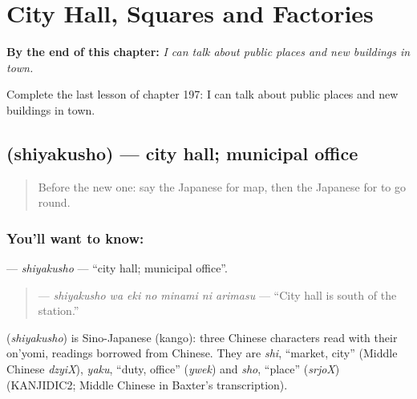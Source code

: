 
\chapter{City Hall, Squares and Factories}
\label{ch:ja-city-hall-squares-and-factories}

\begin{chapteropening}
\textbf{By the end of this chapter:} \emph{I can talk about public places and new buildings in town.}

Complete the last lesson of chapter 197: I can talk about public places and new buildings in town.
\end{chapteropening}

\section[\texorpdfstring{\ja{しやくしょ} (shiyakusho)}{しやくしょ (shiyakusho)}]{ (shiyakusho) — city hall; municipal office}

\label{lesson:JA-C197-shiyakusho}



\begin{quote}
Before the new one: say the Japanese for map, then the Japanese for to go round.
\end{quote}

\subsection*{You'll want to know: }
\textbf{} — \emph{shiyakusho} — \textquotedblleft{}city hall; municipal office\textquotedblright{}.

\begin{quote}
\textbf{   } — \emph{shiyakusho wa eki no minami ni arimasu} — \textquotedblleft{}City hall is south of the station.\textquotedblright{}
\end{quote}

\begin{cousinweb}
\textbf{} (\emph{shiyakusho}) is Sino-Japanese (kango): three Chinese characters read with their on'yomi, readings borrowed from Chinese. They are \emph{shi}, \textquotedblleft{}market, city\textquotedblright{} (Middle Chinese \emph{dzyiX}), \emph{yaku}, \textquotedblleft{}duty, office\textquotedblright{} (\emph{ywek}) and \emph{sho}, \textquotedblleft{}place\textquotedblright{} (\emph{srjoX}) (KANJIDIC2; Middle Chinese in Baxter's transcription).
\end{cousinweb}

